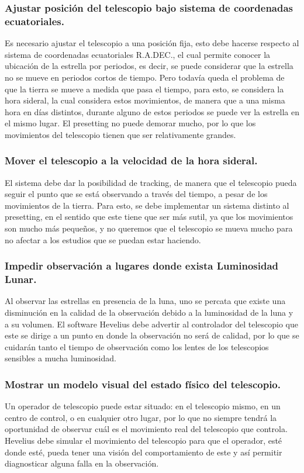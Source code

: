 \documentclass[letterpaper,spanish,10pt]{article}
\begin{document}
\subsubsection{Ajustar posici\'on del telescopio bajo sistema de coordenadas ecuatoriales.}
Es necesario ajustar el telescopio a una posici\'on fija, esto debe hacerse respecto al sistema de coordenadas ecuatoriales R.A.DEC., el cual permite conocer la ubicaci\'on de la estrella por periodos, es decir, se puede considerar que la estrella no se mueve en periodos cortos de tiempo. Pero todav\'ia queda el problema de que la tierra se mueve a medida que pasa el tiempo, para esto, se considera la hora sideral, la cual considera estos movimientos, de manera que a una misma hora en d\'ias distintos, durante alguno de estos periodos se puede ver la estrella en el mismo lugar. El presetting no puede demorar mucho, por lo que los movimientos del telescopio tienen que ser relativamente grandes.

\subsubsection{Mover el telescopio a la velocidad de la hora sideral.}
El sistema debe dar la posibilidad de tracking, de manera que el telescopio pueda seguir el punto que se est\'a observando a trav\'es del tiempo, a pesar de los movimientos de la tierra. Para esto, se debe implementar un sistema distinto al presetting, en el sentido que este tiene que ser m\'as sutil, ya que los movimientos son mucho m\'as peque\~nos, y no queremos que el telescopio se mueva mucho para no afectar a los estudios que se puedan estar haciendo.

\subsubsection{Impedir observaci\'on a lugares donde exista Luminosidad Lunar.}
Al observar las estrellas en presencia de la luna, uno se percata que existe una disminuci\'on en la calidad de la observaci\'on debido a la luminosidad de la luna y a su volumen. El software Hevelius debe advertir al controlador del telescopio que este se dirige a un punto en donde la observaci\'on no ser\'a de calidad, por lo que se cuidar\'an tanto el tiempo de observaci\'on como los lentes de los telescopios sensibles a mucha luminosidad.

\subsubsection{Mostrar un modelo visual del estado f\'isico del telescopio.}
Un operador de telescopio puede estar situado: en el telescopio mismo, en un centro de control, o en cualquier otro lugar, por lo que no siempre tendr\'a la oportunidad de observar cu\'al es el movimiento real del telescopio que controla. Hevelius debe simular el movimiento del telescopio para que el operador, est\'e donde est\'e, pueda tener una visi\'on del comportamiento de este y as\'i permitir diagnosticar alguna falla en la observaci\'on.
\end{document}
